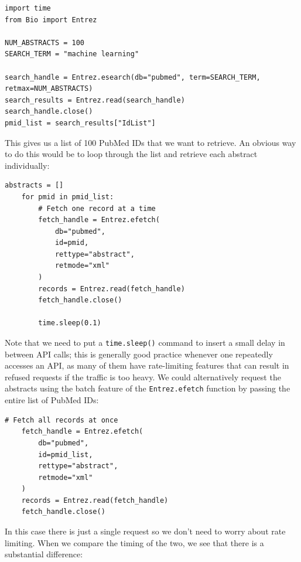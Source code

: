 
\begin{lstlisting}[style=Python]
import time
from Bio import Entrez

NUM_ABSTRACTS = 100
SEARCH_TERM = "machine learning"

search_handle = Entrez.esearch(db="pubmed", term=SEARCH_TERM, retmax=NUM_ABSTRACTS)
search_results = Entrez.read(search_handle)
search_handle.close()
pmid_list = search_results["IdList"]
\end{lstlisting}

This gives us a list of 100 PubMed IDs that we want to retrieve.  An obvious way to do this would be to loop through the list and retrieve each abstract individually:

\begin{lstlisting}[style=Python]
abstracts = []
    for pmid in pmid_list:
        # Fetch one record at a time
        fetch_handle = Entrez.efetch(
            db="pubmed",
            id=pmid,
            rettype="abstract",
            retmode="xml"
        )
        records = Entrez.read(fetch_handle)
        fetch_handle.close()

        time.sleep(0.1)
\end{lstlisting}

Note that we need to put a \texttt{time.sleep()} command to insert a small delay in between API calls; this is generally good practice whenever one repeatedly accesses an API, as many of them have rate-limiting features that can result in refused requests if the traffic is too heavy.  We could alternatively request the abstracts using the batch feature of the \texttt{Entrez.efetch} function by passing the entire list of PubMed IDs:

\begin{lstlisting}[style=Python]
# Fetch all records at once
    fetch_handle = Entrez.efetch(
        db="pubmed",
        id=pmid_list,
        rettype="abstract",
        retmode="xml"
    )
    records = Entrez.read(fetch_handle)
    fetch_handle.close()
\end{lstlisting}

In this case there is just a single request so we don't need to worry about rate limiting.  When we compare the timing of the two, we see that there is a substantial difference:

